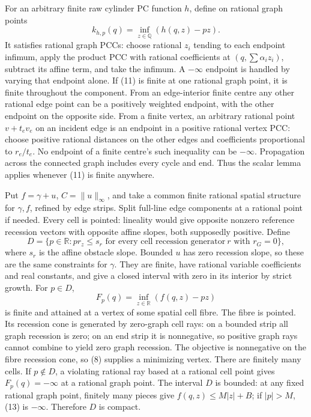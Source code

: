 \documentclass[
  11pt,
]{article}
\begin{document}
For an arbitrary finite raw cylinder PC function \(h\), define on
rational graph points \[
 k_{h,p}(q)=\inf_{z\in\mathbb{Q}}(h(q,z)-pz).                 \tag{11}
\] It satisfies rational graph PCCs: choose rational \(z_i\) tending to
each endpoint infimum, apply the product PCC with rational coefficients
at \((q,\sum\alpha_i z_i)\), subtract its affine term, and take the
infimum. A \(-\infty\) endpoint is handled by varying that endpoint
alone. If (11) is finite at one rational graph point, it is finite
throughout the component. From an edge-interior finite centre any other
rational edge point can be a positively weighted endpoint, with the
other endpoint on the opposite side. From a finite vertex, an arbitrary
rational point \(v+t_ev_e\) on an incident edge is an endpoint in a
positive rational vertex PCC: choose positive rational distances on the
other edges and coefficients proportional to \(r_e/t_e\). No endpoint of
a finite centre's such inequality can be \(-\infty\). Propagation across
the connected graph includes every cycle and end. Thus the scalar lemma
applies whenever (11) is finite anywhere.

Put \(f=\gamma+u\), \(C=\|u\|_\infty\), and take a common finite
rational spatial structure for \(\gamma,f\), refined by edge strips.
Split full-line edge components at a rational point if needed. Every
cell is pointed: lineality would give opposite nonzero reference
recession vectors with opposite affine slopes, both supposedly positive.
Define \[
 D=\{p\in\mathbb{R}:p r_z\leq s_r\text{ for every cell recession generator}
                                      \ r\text{ with }r_G=0\},           \tag{12}
\] where \(s_r\) is the affine obstacle slope. Bounded \(u\) has zero
recession slope, so these are the same constraints for \(\gamma\). They
are finite, have rational variable coefficients and real constants, and
give a closed interval with zero in its interior by strict growth. For
\(p\in D\), \[
                         F_p(q)=\inf_{z\in\mathbb{R}}(f(q,z)-pz)          \tag{13}
\] is finite and attained at a vertex of some spatial cell fibre. The
fibre is pointed. Its recession cone is generated by zero-graph cell
rays: on a bounded strip all graph recession is zero; on an end strip it
is nonnegative, so positive graph rays cannot combine to yield zero
graph recession. The objective is nonnegative on the fibre recession
cone, so (8) supplies a minimizing vertex. There are finitely many
cells. If \(p\notin D\), a violating rational ray based at a rational
cell point gives \(F_p(q)=-\infty\) at a rational graph point. The
interval \(D\) is bounded: at any fixed rational graph point, finitely
many pieces give \(f(q,z)\leq M|z|+B\); if \(|p|>M\), (13) is
\(-\infty\). Therefore \(D\) is compact.
\end{document}
